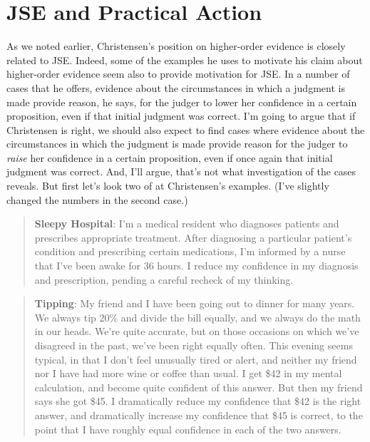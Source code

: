 \documentclass[
  10pt,
  letterpaper,
  DIV=11,
  numbers=noendperiod,
  twoside]{scrartcl}
\begin{document}
\section{JSE and Practical Action}\label{jse-and-practical-action}

As we noted earlier, Christensen's position on higher-order evidence is
closely related to JSE. Indeed, some of the examples he uses to motivate
his claim about higher-order evidence seem also to provide motivation
for JSE. In a number of cases that he offers, evidence about the
circumstances in which a judgment is made provide reason, he says, for
the judger to lower her confidence in a certain proposition, even if
that initial judgment was correct. I'm going to argue that if
Christensen is right, we should also expect to find cases where evidence
about the circumstances in which the judgment is made provide reason for
the judger to \emph{raise} her confidence in a certain proposition, even
if once again that initial judgment was correct. And, I'll argue, that's
not what investigation of the cases reveals. But first let's look two of
at Christensen's examples. (I've slightly changed the numbers in the
second case.)

\begin{quote}
\textbf{Sleepy Hospital}: I'm a medical resident who diagnoses patients
and prescribes appropriate treatment. After diagnosing a particular
patient's condition and prescribing certain medications, I'm informed by
a nurse that I've been awake for 36 hours. I reduce my confidence in my
diagnosis and prescription, pending a careful recheck of my thinking.
\end{quote}

\begin{quote}
\textbf{Tipping}: My friend and I have been going out to dinner for many
years. We always tip 20\% and divide the bill equally, and we always do
the math in our heads. We're quite accurate, but on those occasions on
which we've disagreed in the past, we've been right equally often. This
evening seems typical, in that I don't feel unusually tired or alert,
and neither my friend nor I have had more wine or coffee than usual. I
get \$42 in my mental calculation, and become quite confident of this
answer. But then my friend says she got \$45. I dramatically reduce my
confidence that \$42 is the right answer, and dramatically increase my
confidence that \$45 is correct, to the point that I have roughly equal
confidence in each of the two answers.
\end{quote}
\end{document}
